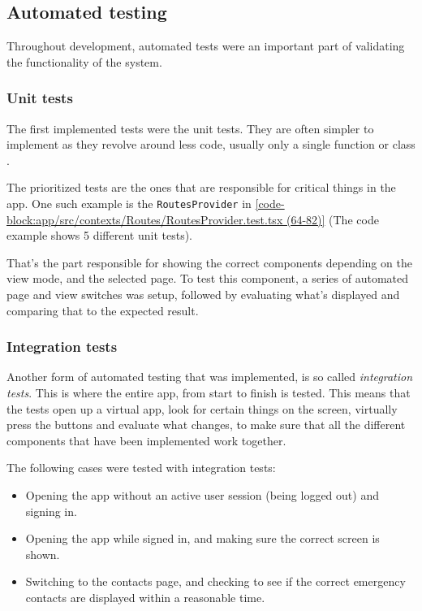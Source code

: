 \subsection{Automated testing}
Throughout development, automated tests were an important part of validating the functionality of the system.

\subsubsection{Unit tests}
The first implemented tests were the unit tests. They are often simpler to implement as they revolve around less code, usually only a single function or class .

\clearpage
{}

The prioritized tests are the ones that are responsible for critical things in the app. One such example is the \verb|RoutesProvider| in \autoref{code-block:app/src/contexts/Routes/RoutesProvider.test.tsx (64-82)} (The code example shows 5 different unit tests). 

That's the part responsible for showing the correct components depending on the view mode, and the selected page. To test this component, a series of automated page and view switches was setup, followed by evaluating what's displayed and comparing that to the expected result.

\subsubsection{Integration tests}
Another form of automated testing that was implemented, is so called \textit{integration tests}. This is where the entire app, from start to finish is tested. This means that the tests open up a virtual app, look for certain things on the screen, virtually press the buttons and evaluate what changes, to make sure that all the different components that have been implemented work together.

The following cases were tested with integration tests:
\begin{itemize}
    \item Opening the app without an active user session (being logged out) and signing in.
    \item Opening the app while signed in, and making sure the correct screen is shown.
    \item Switching to the contacts page, and checking to see if the correct emergency contacts are displayed within a reasonable time.
\end{itemize}

